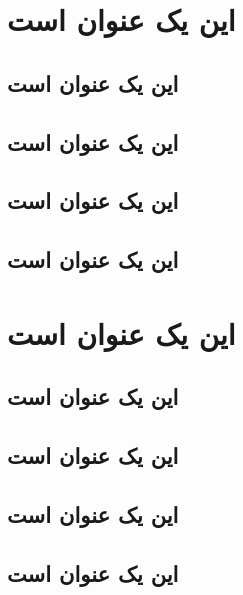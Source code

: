 \documentclass{report}
\begin{document}
\tableofcontents
\chapter{این یک عنوان است}
\section{این یک عنوان است}
\section{این یک عنوان است}
\section{این یک عنوان است}
\section{این یک عنوان است}
\chapter{این یک عنوان است}
\section{این یک عنوان است}
\section{این یک عنوان است}
\section{این یک عنوان است}
\section{این یک عنوان است}
\contentsfinish
\end{document}

